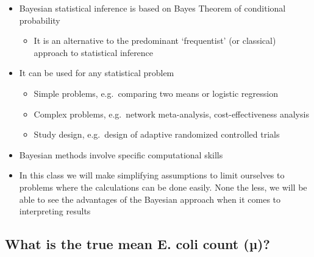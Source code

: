 \documentclass[
]{book}
\providecommand{\tightlist}{%
  \setlength{\itemsep}{0pt}\setlength{\parskip}{0pt}}
\begin{document}
\begin{itemize}
\tightlist
\item
  Bayesian statistical inference is based on Bayes Theorem of conditional probability

  \begin{itemize}
  \tightlist
  \item
    It is an alternative to the predominant `frequentist' (or classical) approach to statistical inference
  \end{itemize}
\item
  It can be used for any statistical problem

  \begin{itemize}
  \tightlist
  \item
    Simple problems, e.g.~comparing two means or logistic regression
  \item
    Complex problems, e.g.~network meta-analysis, cost-effectiveness analysis
  \item
    Study design, e.g.~design of adaptive randomized controlled trials
  \end{itemize}
\item
  Bayesian methods involve specific computational skills
\item
  In this class we will make simplifying assumptions to limit ourselves to problems where the calculations can be done easily. None the less, we will be able to see the advantages of the Bayesian approach when it comes to interpreting results
\end{itemize}

\hypertarget{what-is-the-true-mean-e.-coli-count-uxb5}{%
\subsection{What is the true mean E. coli count (µ)?}\label{what-is-the-true-mean-e.-coli-count-uxb5}}
\end{document}
